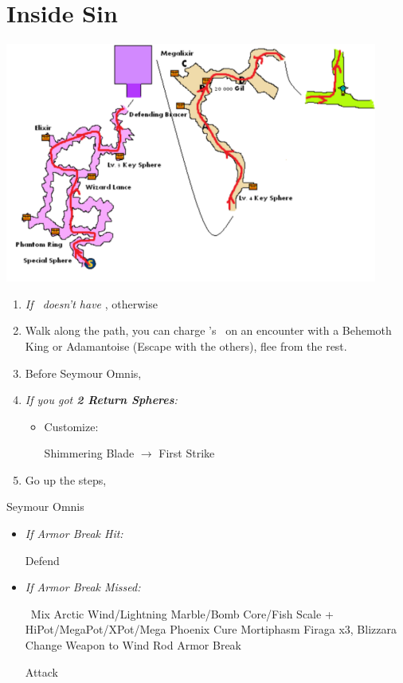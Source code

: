 \chapter{Inside Sin}
\includegraphics{graphics/sinpath}
\begin{enumerate}
    \item \textit{If \rikku\ doesn't have \od} \formation{\tidus}{\auron}{\rikku}, otherwise \formation{\tidus}{\auron}{\kimahri}
    \item Walk along the path, you can charge \rikku's \od\ on an encounter with a Behemoth King or Adamantoise (Escape with the others), flee from the rest.
    \item Before Seymour Omnis, \formation{\tidus}{\auron}{\yuna}
    \item \textit{If you got \textbf{2 Return Spheres}:}
    \begin{itemize}
        \item Customize:
        \begin{itemize}
            \auronf Shimmering Blade $\rightarrow$ First Strike
        \end{itemize}
    \end{itemize}
    \item Go up the steps, \sd
\end{enumerate}
\bothvfill\winvfill\lossvfill
\begin{battle}[80000]{Seymour Omnis}
    \begin{itemize}
        \yunaf Defend
        \tidusf Armor Break
        \item \textit{If Armor Break Hit:}
        \begin{itemize}
            \auronf Defend
        \end{itemize}
        \item \textit{If Armor Break Missed:}
        \begin{itemize}
            \switch{\auron}{\rikku}
            \rikkuf \od\ Mix Arctic Wind/Lightning Marble/Bomb Core/Fish Scale + HiPot/MegaPot/XPot/Mega Phoenix
            \yunaf Cure Mortiphasm
            \enemyf Firaga x3, Blizzara
            \yunaf Change Weapon to Wind Rod
            \tidusf Armor Break
        \end{itemize}
        \summon{\bahamut}
        \bahamutf Attack
    \end{itemize}
\end{battle}
